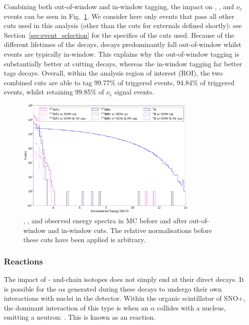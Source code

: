 Combining both out-of-window and in-window  tagging, the impact on , , and \beight{} $\nu_e$ events can be seen in Fig.~\ref{fig:bipo_tagging_efficiency}. We consider here only events that pass all other cuts used in this analysis (other than the cuts for externals defined shortly): see Section~\ref{sec:event_selection} %
for the specifics of the cuts used. Because of the different lifetimes of the decays,  decays predominantly fall out-of-window whilst  events are typically in-window. This explains why the out-of-window tagging is substantially better at cutting  decays, whereas the in-window tagging far better tags  decays. Overall, within the analysis region of interest (ROI), the two combined cuts are able to tag 99.77\% %
of  triggered events, 94.84\% %
of  triggered events, whilst retaining 99.85\% %
of \beight{} $\nu_e$ signal events.

\begin{figure}
    \centering
    \includegraphics[width=0.8\textwidth]{6_SolarAnalysis/images/bipo_tagging_eff.pdf}
    \caption[, , and \beight{} observed energy spectra before and after out-of-window and in-window cuts]{, , and \beight{} observed energy spectra in MC before and after out-of-window and in-window cuts. The relative normalisations before these cuts have been applied is arbitrary.}
    \label{fig:bipo_tagging_efficiency}
\end{figure}

\subsubsection{\alphan{} Reactions}\label{sec:alphans}
The impact of - and-chain isotopes does not simply end at their direct decays. It is possible for the $\alpha$s generated during these decays to undergo their own interactions with nuclei in the detector. Within the organic scintillator of SNO+, the dominant interaction of this type is when an $\alpha$ collides with a  nucleus, emitting a neutron: . This is known as an \alphan{} reaction.


